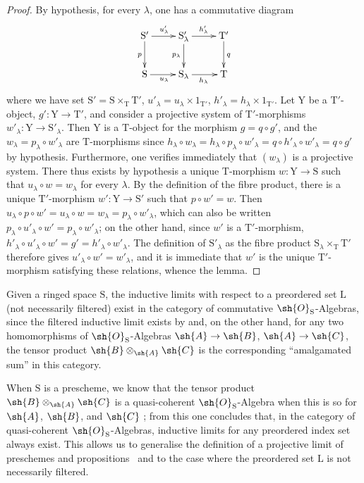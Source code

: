 \begin{proof}
By hypothesis, for every $\lambda$, one has a commutative diagram
\[
\xymatrix{
  \mathrm{S}' \ar[r]^{u'_\lambda} \ar[d]_p & \mathrm{S}'_\lambda \ar[r]^{h'_\lambda} \ar[d]_{p_\lambda} & \mathrm{T}' \ar[d]^q \\
  \mathrm{S} \ar[r]_{u_\lambda} & \mathrm{S}_\lambda \ar[r]_{h_\lambda} & \mathrm{T}
}
\]
where we have set $\mathrm{S}'=\mathrm{S}\times_\mathrm{T}\mathrm{T}'$, $u'_\lambda=u_\lambda\times 1_{\mathrm{T}'}$, $h'_\lambda=h_\lambda\times 1_{\mathrm{T}'}$.
Let $\mathrm{Y}$ be a $\mathrm{T}'$-object, $g':\mathrm{Y}\to\mathrm{T}'$, and consider a projective system of $\mathrm{T}'$-morphisms $w'_\lambda:\mathrm{Y}\to\mathrm{S}'_\lambda$.
Then $\mathrm{Y}$ is a $\mathrm{T}$-object for the morphism $g=q\circ g'$, and the $w_\lambda=p_\lambda\circ w'_\lambda$ are $\mathrm{T}$-morphisms since $h_\lambda\circ w_\lambda=h_\lambda\circ p_\lambda\circ w'_\lambda=q\circ h'_\lambda\circ w'_\lambda=q\circ g'$ by hypothesis.
Furthermore, one verifies immediately that $(w_\lambda)$ is a projective system.
There thus exists by hypothesis a unique $\mathrm{T}$-morphism $w:\mathrm{Y}\to\mathrm{S}$ such that $u_\lambda\circ w=w_\lambda$ for every $\lambda$.
By the definition of the fibre product, there is a unique $\mathrm{T}'$-morphism $w':\mathrm{Y}\to\mathrm{S}'$ such that $p\circ w'=w$.
Then $u_\lambda\circ p\circ w'=u_\lambda\circ w=w_\lambda=p_\lambda\circ w'_\lambda$, which can also be written $p_\lambda\circ u'_\lambda\circ w'=p_\lambda\circ w'_\lambda$; on the other hand, since $w'$ is a $\mathrm{T}'$-morphism, $h'_\lambda\circ u'_\lambda\circ w'=g'=h'_\lambda\circ w'_\lambda$. The definition of $\mathrm{S}'_\lambda$ as the fibre product $\mathrm{S}_\lambda\times_\mathrm{T}\mathrm{T}'$ therefore gives $u'_\lambda\circ w'=w'_\lambda$, and it is immediate that $w'$ is the unique $\mathrm{T}'$-morphism satisfying these relations, whence the lemma.
\end{proof}

\begin{remark}[8.2.7]
\label{IV.8.2.7}
Given a ringed space $\mathrm{S}$, the inductive limits with respect to a preordered set $\mathrm{L}$ (not necessarily filtered) exist in the category of commutative $\sh{O}_\mathrm{S}$-Algebras, since the filtered inductive limit exists by  and, on the other hand, for any two homomorphisms of $\sh{O}_\mathrm{S}$-Algebras $\sh{A}\to\sh{B}$, $\sh{A}\to\sh{C}$, the tensor product $\sh{B}\otimes_{\sh{A}}\sh{C}$ is the corresponding ``amalgamated sum'' in this category.

When $\mathrm{S}$ is a prescheme, we know that the tensor product $\sh{B}\otimes_{\sh{A}}\sh{C}$ is a quasi-coherent $\sh{O}_\mathrm{S}$-Algebra when this is so for $\sh{A}$, $\sh{B}$, and $\sh{C}$ ; from this one concludes that, in the category of quasi-coherent $\sh{O}_\mathrm{S}$-Algebras, inductive limits for any preordered index set always exist.
This allows us to generalise the definition of a projective limit of preschemes and propositions~ and  to the case where the preordered set $\mathrm{L}$ is not necessarily filtered.
\end{remark}

